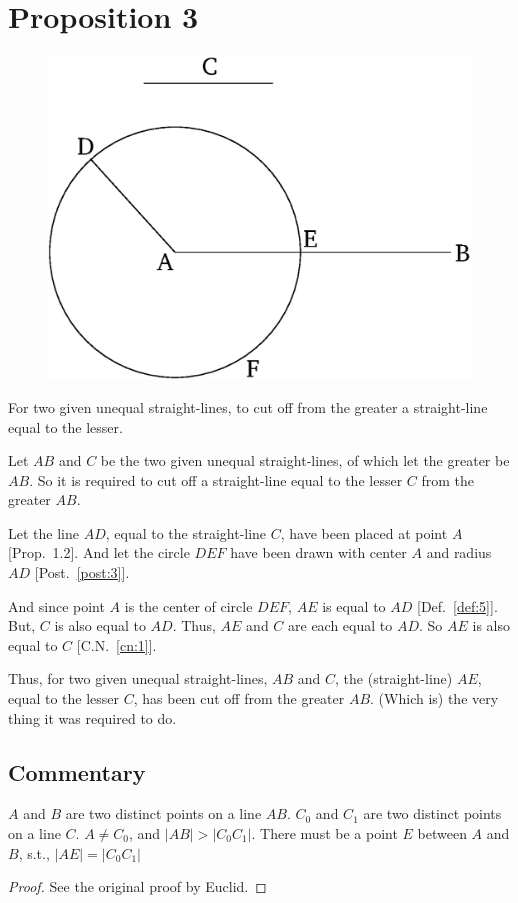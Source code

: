 \chapter*{Proposition 3}
\label{prop:3}

\begin{figure}[ht]
    \begin{center}
    \includegraphics[width=0.5\linewidth]{figures/fig03e.eps}
    \label{fig:prop_3}
    \end{center}
\end{figure}

For two given unequal straight-lines, to cut off from the greater a straight-line
equal to the lesser.

Let $AB$ and $C$ be the two given unequal straight-lines, of which let the greater be $AB$. So it is required to cut off a straight-line equal to the lesser $C$ from the greater $AB$.

Let the line $AD$, equal to the straight-line $C$, have been placed at  point $A$ [Prop.~1.2]. And let
the circle $DEF$ have been drawn with center $A$ and radius $AD$ [Post.~\ref{post:3}].

And since  point $A$ is the center of  circle $DEF$, $AE$ is equal to $AD$ [Def.~\ref{def:5}]. But,
$C$ is also equal to $AD$. Thus, $AE$ and $C$ are each equal to $AD$. So $AE$
is also equal to $C$ [C.N.~\ref{cn:1}].

Thus, for two given unequal straight-lines, $AB$ and $C$, the (straight-line) $AE$, equal to
the lesser $C$, has been cut off from the greater $AB$. (Which is) the very thing it was required to do.

\section*{Commentary}

\begin{proposition}\label{proposition_3}\leanok
   $A$ and $B$ are two distinct points on a line $AB$. $C_0$ and $C_1$ are two distinct points on a line $C$. $A \neq C_0$, and $|AB| > |C_0C_1|$. There must be a point $E$ between $A$ and $B$, s.t., $|AE| = |C_0C_1|$
\end{proposition}
\begin{proof}
    \leanok
    See the original proof by Euclid.
\end{proof}
